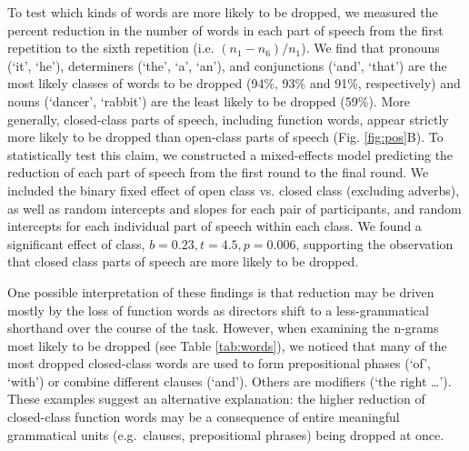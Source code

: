\documentclass[alpha-refs]{wiley-article}
\begin{document}
To test which kinds of words are more likely to be dropped, we measured the percent reduction in the number of words in each part of speech from the first repetition to the sixth repetition (i.e. $(n_1 - n_6)/n_1$).
We find that pronouns (`it', `he'), determiners (`the', `a', `an'), and conjunctions (`and', `that') are the most likely classes of words to be dropped (94\%, 93\% and 91\%, respectively) and nouns (`dancer', `rabbit') are the least likely to be dropped (59\%).
More generally, closed-class parts of speech, including function words, appear strictly more likely to be dropped than open-class parts of speech (Fig. \ref{fig:pos}B).
To statistically test this claim, we constructed a mixed-effects model predicting the reduction of each part of speech from the first round to the final round.
We included the binary fixed effect of open class vs. closed class (excluding adverbs), as well as random intercepts and slopes for each pair of participants, and random intercepts for each individual part of speech within each class.
We found a significant effect of class, $b=0.23, t = 4.5, p = 0.006$, supporting the observation that closed class parts of speech are more likely to be dropped. 

One possible interpretation of these findings is that reduction may be driven mostly by the loss of function words as directors shift to a less-grammatical shorthand over the course of the task.
However, when examining the n-grams most likely to be dropped (see Table \ref{tab:words}), we noticed that many of the most dropped closed-class words are used to  form prepositional phases (`of', `with') or combine different clauses (`and').
Others are modifiers (`the right \dots').
These examples suggest an alternative explanation: the higher reduction of closed-class function words may be a consequence of entire meaningful grammatical units (e.g.~clauses, prepositional phrases) being dropped at once.
\end{document}
